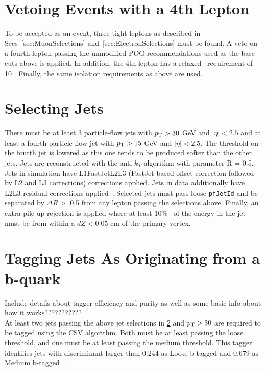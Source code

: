 \section{Vetoing Events with a 4th Lepton}
\label{sec:4thLeptonVeto}
To be accepted as an event, three tight leptons as described in Secs~\ref{sec:MuonSelections} and~\ref{sec:ElectronSelections} must be found. A veto on a fourth lepton passing the unmodified POG recommendations used as the base cuts above is applied. In addition, the 4th lepton has a relaxed \pt \ requirement of 10 \GeV. Finally, the same isolation requirements as above are used.

\section{Selecting Jets}
\label{sec:JetSelection}
There must be at least 3 particle-flow jets with $p_{\mathrm{T}} > 30$ GeV and $|\eta| < 2.5$ and at least a fourth particle-flow jet with $p_{\mathrm{T}} > 15$ GeV and $|\eta| < 2.5$. The threshold on the fourth jet is lowered as this one tends to be produced softer than the other jets.
Jets are reconstructed with the anti-$k_{T}$ algorithm with parameter R = 0.5.  
Jets in simulation have L1FastJetL2L3 (FastJet-based offset correction followed by L2 and L3 corrections) corrections applied.  
Jets in data additionally have L2L3 residual corrections applied~\cite{jetcorrectionstwiki}. 
Selected jets must pass loose {\tt pfJetId} and be separated by $\Delta R >$ 0.5 from any lepton passing the selections above. Finally, an extra pile up rejection is applied where at least 10\% \ of the energy in the jet must be from within a $dZ < 0.05$ cm of the primary vertex.

\section{Tagging Jets As Originating from a b-quark}
\label{sec:bTagSelection}

Include details about tagger efficiency and purity as well as some basic info about how it works???????????\\

At least two jets passing the above jet selections in \ref{sec:JetSelection} and $p_{\mathrm{T}} > 30$ are required to be tagged using the CSV algorithm. Both must be at least passing the loose threshold, and one must be at least passing the medium threshold.
This tagger identifies jets with discriminant larger than  0.244 as Loose b-tagged and 0.679 as Medium b-tagged~\cite{btagICHEP2012twiki}.




